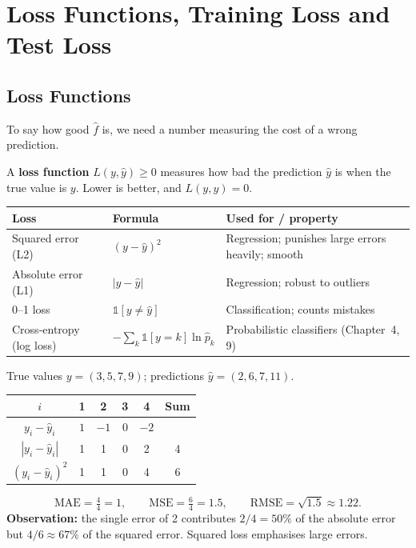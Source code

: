 \section{Loss Functions, Training Loss and Test Loss}

\subsection{Loss Functions}

To say how good $\hat f$ is, we need a number measuring the cost of a wrong prediction.

\begin{definition}
A \textbf{loss function} $L(y,\hat y)\ge 0$ measures how bad the prediction $\hat y$ is when the true value is $y$. Lower is better, and $L(y,y)=0$.
\end{definition}

\begin{center}
\begin{tabular}{@{}p{3.5cm}p{4.6cm}p{5.4cm}@{}}
\toprule
\textbf{Loss} & \textbf{Formula} & \textbf{Used for / property}\\
\midrule
Squared error (L2) & $(y-\hat y)^2$ & Regression; punishes large errors heavily; smooth\\
Absolute error (L1) & $|y-\hat y|$ & Regression; robust to outliers\\
0--1 loss & $\mathbb{1}[y\neq\hat y]$ & Classification; counts mistakes\\
Cross-entropy (log loss) & $-\sum_k \mathbb{1}[y=k]\ln \hat p_k$ & Probabilistic classifiers (Chapter~4, 9)\\
\bottomrule
\end{tabular}
\end{center}

\begin{example}
True values $y=(3,5,7,9)$; predictions $\hat y=(2,6,7,11)$.

\begin{center}
\begin{tabular}{@{}c|cccc|c@{}}
\toprule
$i$ & 1 & 2 & 3 & 4 & \textbf{Sum}\\
\midrule
$y_i-\hat y_i$ & $1$ & $-1$ & $0$ & $-2$ & \\
$|y_i-\hat y_i|$ & 1 & 1 & 0 & 2 & 4\\
$(y_i-\hat y_i)^2$ & 1 & 1 & 0 & 4 & 6\\
\bottomrule
\end{tabular}
\end{center}
\[
  \text{MAE}=\tfrac{4}{4}=1,\qquad
  \text{MSE}=\tfrac{6}{4}=1.5,\qquad
  \text{RMSE}=\sqrt{1.5}\approx 1.22 .
\]
\textbf{Observation:} the single error of 2 contributes $2/4=50\%$ of the absolute error but $4/6\approx 67\%$ of the squared error. Squared loss emphasises large errors.
\end{example}

